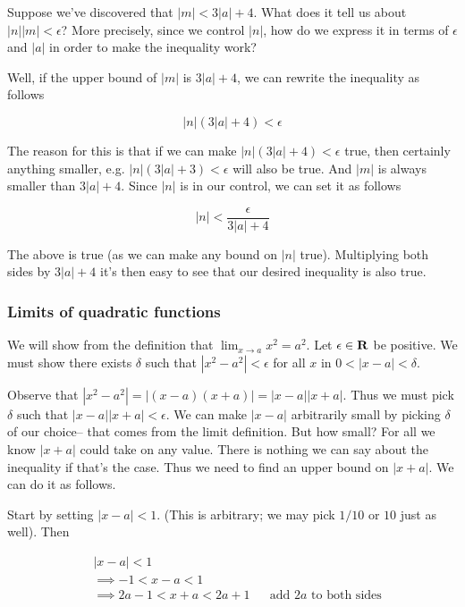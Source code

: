 \vs

Suppose we've discovered that $|m|<3|a|+4$. What does it tell us about
$|n||m|<\epsilon$? More precisely, since we control $|n|$, how do we express
it in terms of $\epsilon$ and $|a|$ in order to make the inequality work?

\vs

Well, if the upper bound of $|m|$ is $3|a|+4$, we can rewrite the
inequality as follows

\[|n|(3|a|+4)<\epsilon\]

The reason for this is that if we can make $|n|(3|a|+4)<\epsilon$ true, then
certainly anything smaller, e.g. $|n|(3|a|+3)<\epsilon$ will also be true.
And $|m|$ is always smaller than $3|a|+4$. Since $|n|$ is in our
control, we can set it as follows

\[|n|<\frac{\epsilon}{3|a|+4}\]

The above is true (as we can make any bound on $|n|$ true).
Multiplying both sides by $3|a|+4$ it's then easy to see that our
desired inequality is also true.

\subsubsection*{Limits of quadratic functions}

We will show from the definition that $\lim_{x\to a}x^2=a^2$. Let
$\epsilon\in\mathbf{R}$ be positive. We must show there exists $\delta$ such that
$|x^2-a^2|<\epsilon$ for all $x$ in $0<|x-a|<\delta$.

\vs

Observe that $|x^2-a^2|=|(x-a)(x+a)|=|x-a||x+a|$. Thus we must pick
$\delta$ such that $|x-a||x+a|<\epsilon$. We can make $|x-a|$ arbitrarily small by
picking $\delta$ of our choice-- that comes from the limit definition. But
how small? For all we know $|x+a|$ could take on any value. There is
nothing we can say about the inequality if that's the case. Thus we
need to find an upper bound on $|x+a|$. We can do it as follows.

\vs

Start by setting $|x-a|<1$. (This is arbitrary; we may pick $1/10$ or
$10$ just as well). Then

\begin{align*}
    &|x-a|<1\\
    &\implies -1<x-a<1\\
    &\implies 2a-1<x+a<2a+1&&\text{add $2a$ to both sides}
\end{align*}

